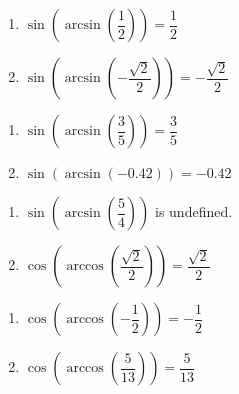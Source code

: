 \documentclass{ximera}
\begin{document}
\begin{multicols}{2}

\begin{enumerate}

\setcounter{enumi}{\value{HW}}

\item $\sin\left(\arcsin\left(\dfrac{1}{2}\right)\right) = \dfrac{1}{2}$ 
\item $\sin\left(\arcsin\left(-\dfrac{\sqrt{2}}{2}\right)\right) = -\dfrac{\sqrt{2}}{2}$

\setcounter{HW}{\value{enumi}}

\end{enumerate}

\end{multicols}

\begin{multicols}{2}

\begin{enumerate}

\setcounter{enumi}{\value{HW}}

\item $\sin\left(\arcsin\left(\dfrac{3}{5}\right)\right) = \dfrac{3}{5}$
\item $\sin\left(\arcsin\left(-0.42\right)\right) = -0.42$ 

\setcounter{HW}{\value{enumi}}

\end{enumerate}

\end{multicols}

\begin{multicols}{2}

\begin{enumerate}

\setcounter{enumi}{\value{HW}}

\item $\sin\left(\arcsin\left(\dfrac{5}{4}\right)\right)$ is undefined. 
\item $\cos\left(\arccos\left(\dfrac{\sqrt{2}}{2}\right)\right) = \dfrac{\sqrt{2}}{2}$

\setcounter{HW}{\value{enumi}}

\end{enumerate}

\end{multicols}

\begin{multicols}{2}

\begin{enumerate}

\setcounter{enumi}{\value{HW}}

\item $\cos\left(\arccos\left(-\dfrac{1}{2}\right)\right) = -\dfrac{1}{2}$
\item $\cos\left(\arccos\left(\dfrac{5}{13}\right)\right) = \dfrac{5}{13}$

\setcounter{HW}{\value{enumi}}

\end{enumerate}

\end{multicols}
\end{document}

